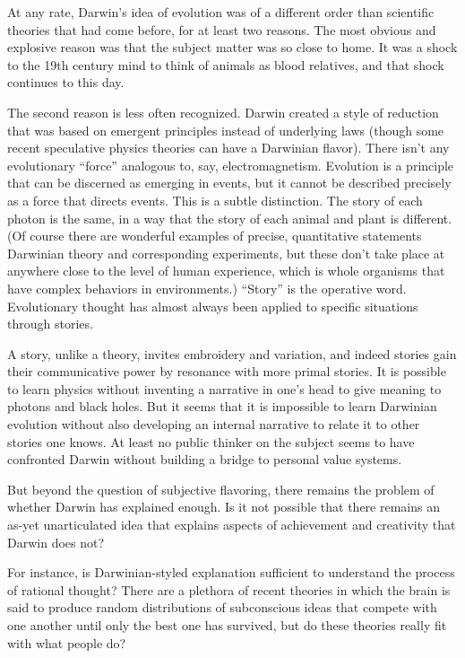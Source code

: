 \documentclass[letterpaper,12pt,english]{sphinxmanual}
\begin{document}
At any rate, Darwin's idea of evolution was of a different order than scientific theories that had come before, for at least two reasons. The most obvious and explosive reason was that the subject matter was so close to home. It was a shock to the 19th century mind to think of animals as blood relatives, and that shock continues to this day.

The second reason is less often recognized. Darwin created a style of reduction that was based on emergent principles instead of underlying laws (though some recent speculative physics theories can have a Darwinian flavor). There isn't any evolutionary ``force'' analogous to, say, electromagnetism. Evolution is a principle that can be discerned as emerging in events, but it cannot be described precisely as a force that directs events. This is a subtle distinction. The story of each photon is the same, in a way that the story of each animal and plant is different. (Of course there are wonderful examples of precise, quantitative statements Darwinian theory and corresponding experiments, but these don't take place at anywhere close to the level of human experience, which is whole organisms that have complex behaviors in environments.) ``Story'' is the operative word. Evolutionary thought has almost always been applied to specific situations through stories.

A story, unlike a theory, invites embroidery and variation, and indeed stories gain their communicative power by resonance with more primal stories. It is possible to learn physics without inventing a narrative in one's head to give meaning to photons and black holes. But it seems that it is impossible to learn Darwinian evolution without also developing an internal narrative to relate it to other stories one knows. At least no public thinker on the subject seems to have confronted Darwin without building a bridge to personal value systems.

But beyond the question of subjective flavoring, there remains the problem of whether Darwin has explained enough. Is it not possible that there remains an as-yet unarticulated idea that explains aspects of achievement and creativity that Darwin does not?

For instance, is Darwinian-styled explanation sufficient to understand the process of rational thought? There are a plethora of recent theories in which the brain is said to produce random distributions of subconscious ideas that compete with one another until only the best one has survived, but do these theories really fit with what people do?
\end{document}
